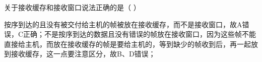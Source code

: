 \question 关于接收缓存和接收窗口说法正确的是（ ）
\par{}
\begin{solution}按序到达的且没有被交付给主机的帧被放在接收缓存，而不是接收窗口，故A错误，C正确；不是按序到达的数据且没有错误的帧放在接收窗口，因为这些帧不能直接给主机，而放在接收缓存的帧是要给主机的，等到缺少的帧收到后，再一起放到接收缓存，这一点要注意区分，故B、D错误；
\end{solution}
